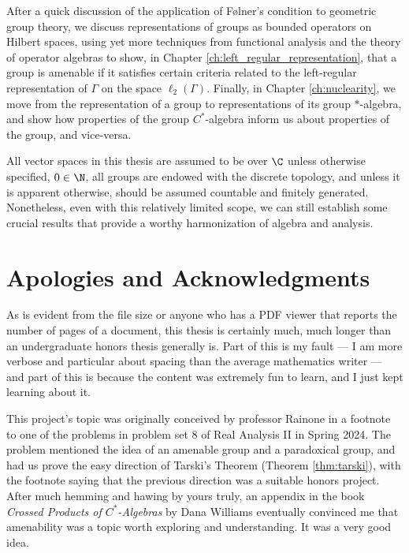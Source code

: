 \documentclass[10pt]{package2}
\begin{document}
After a quick discussion of the application of Følner's condition to geometric group theory, we discuss representations of groups as bounded operators on Hilbert spaces, using yet more techniques from functional analysis and the theory of operator algebras to show, in Chapter \ref{ch:left_regular_representation}, that a group is amenable if it satisfies certain criteria related to the left-regular representation of $\Gamma$ on the space $\ell_2\left(\Gamma\right)$. Finally, in Chapter \ref{ch:nuclearity}, we move from the representation of a group to representations of its group $\ast$-algebra, and show how properties of the group $C^{\ast}$-algebra inform us about properties of the group, and vice-versa.\newline

All vector spaces in this thesis are assumed to be over $\C$ unless otherwise specified, $0\in\N$, all groups are endowed with the discrete topology, and unless it is apparent otherwise, should be assumed countable and finitely generated. Nonetheless, even with this relatively limited scope, we can still establish some crucial results that provide a worthy harmonization of algebra and analysis.
\section{Apologies and Acknowledgments}%
As is evident from the file size or anyone who has a PDF viewer that reports the number of pages of a document, this thesis is certainly much, much longer than an undergraduate honors thesis generally is. Part of this is my fault --- I am more verbose and particular about spacing than the average mathematics writer --- and part of this is because the content was extremely fun to learn, and I just kept learning about it.\newline

This project's topic was originally conceived by professor Rainone in a footnote to one of the problems in problem set 8 of Real Analysis II in Spring 2024. The problem mentioned the idea of an amenable group and a paradoxical group, and had us prove the easy direction of Tarski's Theorem (Theorem \ref{thm:tarski}), with the footnote saying that the previous direction was a suitable honors project. After much hemming and hawing by yours truly, an appendix in the book \textit{Crossed Products of $C^{\ast}$-Algebras} by Dana Williams eventually convinced me that amenability was a topic worth exploring and understanding. It was a very good idea.\newline
\end{document}

